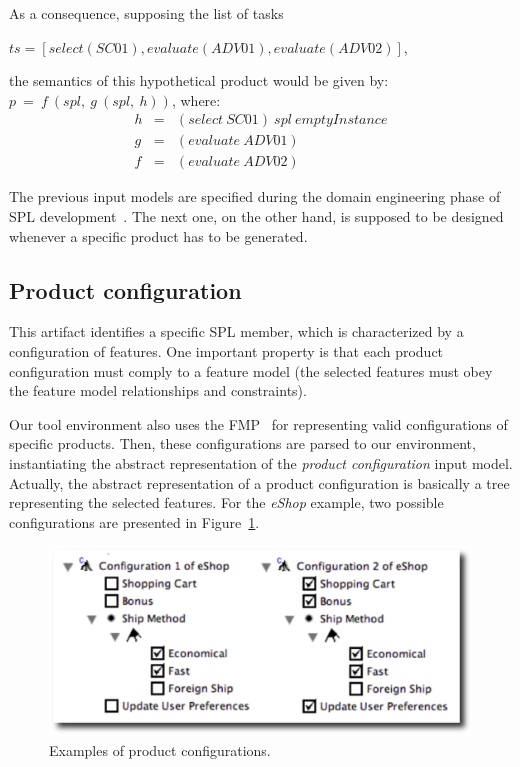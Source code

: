\documentclass{sig-alternate}
\begin{document}
As a consequence, supposing the list of tasks
 
$ts=[select(SC01),evaluate(ADV01),evaluate(ADV02)]$,
 
the semantics of this hypothetical product would be given by: $p\ =\  f\ (spl,\ g\ (spl,\ h))$, where:
\begin{eqnarray*}
h  & = & (select\ SC01)\ spl\ emptyInstance \\
g  & = & (evaluate\ ADV01) \\
f   & = & (evaluate\ ADV02) 
\end{eqnarray*}

The previous input models are specified during the domain
engineering phase of SPL development~\cite{Clements:2001aa,Pohl:2005aa}. The next
one, on the other hand, is supposed to be designed whenever a specific product
has to be generated.

\subsection{Product configuration}\label{subsub:pc}

This artifact identifies a specific SPL member, which is characterized by a
configuration of features. One important property is that each product
configuration must comply to a feature model (the selected features must obey
the feature model relationships and constraints).

Our tool environment also uses the FMP~\cite{Czarnecki:2004aa} for representing valid configurations
of specific products. Then, these configurations are parsed to our
environment, instantiating the abstract representation of the \emph{product
configuration} input model. Actually, the abstract representation of a product
configuration is basically a tree representing the selected features. For the
\emph{eShop} example, two possible configurations are presented in
Figure~\ref{fig:product-config-01-02}.

 \begin{figure}[h]
 \begin{center}
  \includegraphics[scale=0.33]{img/pc-04.eps}
   \caption{Examples of product configurations.}
  \label{fig:product-config-01-02}
  \end{center}
\end{figure}
\end{document}
